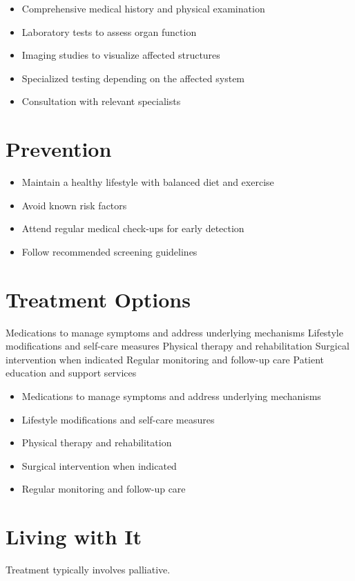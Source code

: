 \begin{itemize}[noitemsep]
  \item Comprehensive medical history and physical examination
  \item Laboratory tests to assess organ function
  \item Imaging studies to visualize affected structures
  \item Specialized testing depending on the affected system
  \item Consultation with relevant specialists
\end{itemize}
\section{Prevention}
\begin{itemize}[noitemsep]
  \item Maintain a healthy lifestyle with balanced diet and exercise
  \item Avoid known risk factors
  \item Attend regular medical check-ups for early detection
  \item Follow recommended screening guidelines
\end{itemize}
\section{Treatment Options}
Medications to manage symptoms and address underlying mechanisms Lifestyle modifications and self-care measures Physical therapy and rehabilitation Surgical intervention when indicated Regular monitoring and follow-up care Patient education and support services

\begin{itemize}[noitemsep]
  \item Medications to manage symptoms and address underlying mechanisms
  \item Lifestyle modifications and self-care measures
  \item Physical therapy and rehabilitation
  \item Surgical intervention when indicated
  \item Regular monitoring and follow-up care
\end{itemize}
\section{Living with It}
Treatment typically involves palliative.

